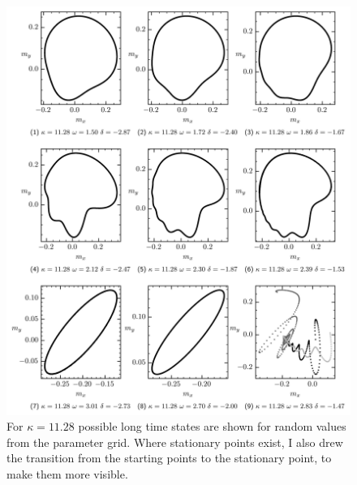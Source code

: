     \begin{figure}[H]
        \hspace*{-1cm}
        \includegraphics{pictures/lc_traj_kcut2.png}
        \caption{For $\kappa=11.28$ possible long time states are shown for random values from the parameter grid. Where stationary points exist, I also drew the transition from the starting points to the stationary point, to make them more visible.}
    \end{figure}
    
